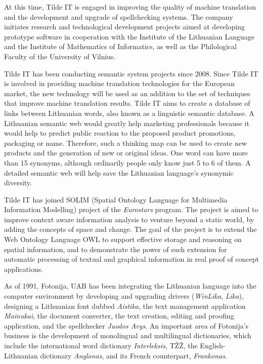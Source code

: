 \begin{multicols}{2}
    At this time, Tilde IT is engaged in improving the quality of machine translation and the development and upgrade of spellchecking systems. The company initiates research and technological development projects aimed at developing prototype software in cooperation with the Institute of the Lithuanian Language and the Institute of Mathematics of Informatics, as well as the Philological Faculty of the University of Vilnius.

    Tilde IT has been conducting semantic system projects since 2008. Since Tilde IT is involved in providing machine translation technologies for the European market, the new technology will be used as an addition to the set of techniques that improve machine translation results. Tilde IT aims to create a database of links between Lithuanian words, also known as a linguistic semantic database. A Lithuanian semantic web would greatly help marketing professionals because it would help to predict public reaction to the proposed product promotions, packaging or name. Therefore, such a thinking map can be used to create new products and the generation of new or original ideas. One word can have more than 15 synonyms, although ordinarily people only know just 5 to 6 of them. A detailed semantic web will help save the Lithuanian language’s synonymic diversity. 

   Tilde IT has joined SOLIM (Spatial Ontology Language for Multimedia Information Modelling) project of the \textit{Eurostars} program. The project is aimed to improve context aware information analysis to venture beyond a static world, by adding the concepts of space and change. The goal of the project is to extend the Web Ontology Language OWL to support effective storage and reasoning on spatial information, and to demonstrate the power of such extension for automatic processing of textual and graphical information in real proof of concept applications. 


    As of 1991, Fotonija, UAB has been integrating the Lithuanian language into the computer environment by developing and upgrading drivers (\textit{WinLika}, \textit{Lika}), designing a Lithuanian font dubbed \textit{Aistika}, the text management application \textit{Mainukai}, the document converter, the text creation, editing and proofing application, and the spellchecker \textit{Juodos Avys}. An important area of Fotonija’s business is the development of monolingual and multilingual dictionaries, which include the international word dictionary \textit{Interleksis}, TŽŽ, the English-Lithuanian dictionary \textit{Anglonas}, and its French counterpart, \textit{Frankonas}.  


\end{multicols}
